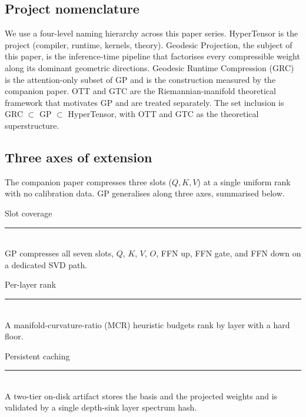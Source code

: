 \documentclass[11pt]{article}
\begin{document}
\subsection{Project nomenclature}
We use a four-level naming hierarchy across this paper series.
HyperTensor is the project (compiler, runtime, kernels, theory).
Geodesic Projection, the subject of this paper, is the inference-time
pipeline that factorises every compressible weight along its dominant
geometric directions. Geodesic Runtime Compression (GRC) is the
attention-only subset of GP and is the construction measured by the
companion paper. OTT and GTC are the Riemannian-manifold theoretical
framework that motivates GP and are treated separately. The set
inclusion is GRC $\subset$ GP $\subset$ HyperTensor, with OTT and GTC
as the theoretical superstructure.

\subsection{Three axes of extension}
The companion paper compresses three slots ($Q,K,V$) at a single uniform
rank with no calibration data. GP generalises along three axes, summarised
below.

\begin{center}
\begin{minipage}[t]{0.31\linewidth}\centering\small
Slot coverage\\[2pt]
\rule{0.7\linewidth}{0.4pt}\\[2pt]
GP compresses all seven slots, $Q$, $K$, $V$, $O$, FFN up, FFN gate, and
FFN down on a dedicated SVD path.
\end{minipage}\hfill
\begin{minipage}[t]{0.31\linewidth}\centering\small
Per-layer rank\\[2pt]
\rule{0.7\linewidth}{0.4pt}\\[2pt]
A manifold-curvature-ratio (MCR) heuristic budgets rank by layer with a
hard floor.
\end{minipage}\hfill
\begin{minipage}[t]{0.31\linewidth}\centering\small
Persistent caching\\[2pt]
\rule{0.7\linewidth}{0.4pt}\\[2pt]
A two-tier on-disk artifact stores the basis and the projected weights
and is validated by a single depth-sink layer spectrum hash.
\end{minipage}
\end{center}
\end{document}

